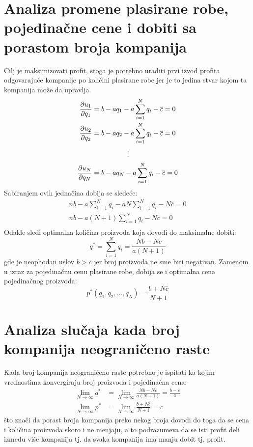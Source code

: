 \documentclass[12pt]{article}
\begin{document}
\section{Analiza promene plasirane robe, pojedinačne cene i dobiti sa porastom
broja kompanija}
\par Cilj je maksimizovati profit, stoga je potrebno uraditi prvi izvod profita
odgovarajuće kompanije po količini plasirane robe jer je to jedina stvar kojom
ta kompanija može da upravlja.
\begin{align*}
	\frac{\partial u_1}{\partial q_1} &= b - a q_1 - a \sum_{i=1}^N q_i
	- \overline{c} = 0\\ 
	\frac{\partial u_2}{\partial q_2} &= b - a q_2 - a \sum_{i=1}^N q_i
	- \overline{c} = 0\\ 
		&\hspace{1.8cm}\vdots \\
	\frac{\partial u_N}{\partial q_N} &= b - a q_N - a \sum_{i=1}^N q_i
	- \overline{c} = 0 \\ 
\end{align*}
Sabiranjem ovih jednačina dobija se sledeće:
\begin{gather*} 	
	n b - a \sum_{i=1}^N q_i - a N \sum_{i=1}^N q_i
	- N \overline{c} = 0 \\
	n b - a (N+1) \sum_{i=1}^N q_i - N \overline{c} = 0 \\
\end{gather*}
Odakle sledi optimalna količina proizvoda koja dovodi do maksimalne dobiti:
\begin{equation}
	q^* = \sum_{i=1}^N q_i = \frac{N b - N \overline{c}}{a (N+1)}
\end{equation}
gde je neophodan uslov $b > \overline{c}$ jer broj proizvoda ne sme biti
negativan.
Zamenom u izraz za pojedinačnu cenu plasirane robe, dobija se i optimalna cena
pojedinačnog proizvoda:
\begin{equation}
	p^* (q_1, q_2, ..., q_N) = \frac{b + N \overline{c}}{N+1}
\end{equation}
\section{Analiza slučaja kada broj kompanija neograničeno raste}
\par Kada broj kompanija neograničeno raste potrebno je ispitati ka kojim
vrednostima konvergiraju broj proizvoda i pojedinačna cena:
\begin{align*}
	\lim_{N \rightarrow \infty} q^*
	&= \lim_{N \rightarrow \infty} \frac{N b - N \overline{c}}{a (N+1)}
	= \frac{b - \overline{c}}{a} \\
	\lim_{N \rightarrow \infty} p^*
	&= \lim_{N \rightarrow \infty} \frac{b + N \overline{c}}{N+1}
	= \overline{c}
\end{align*}
što znači da porast broja kompanija preko nekog broja dovodi do toga da se
cena i količina proizvoda skoro i ne menjaju, a to podrazumeva da se isti
profit deli između više kompanija tj. da svaka kompanija ima manju dobit tj.
profit.
\end{document}
